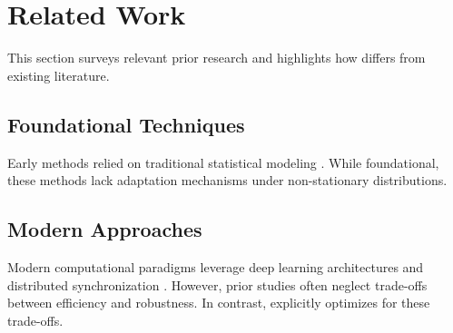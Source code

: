\section{Related Work}
\label{sec:related_work}

This section surveys relevant prior research and highlights how \sister{} differs from existing literature.

\subsection{Foundational Techniques}
Early methods relied on traditional statistical modeling \cite{knuth1984texbook}.
While foundational, these methods lack adaptation mechanisms under non-stationary distributions.

\subsection{Modern Approaches}
Modern computational paradigms leverage deep learning architectures and distributed synchronization \cite{vaswani2017attention}.
However, prior studies often neglect trade-offs between efficiency and robustness.
In contrast, \sister{} explicitly optimizes for these trade-offs.

